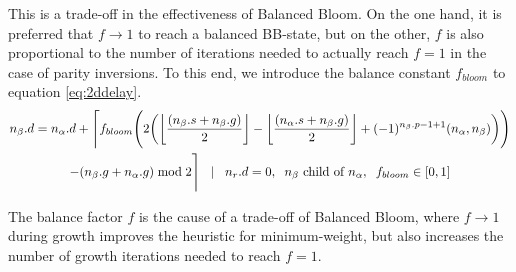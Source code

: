 This is a trade-off in the effectiveness of Balanced Bloom. On the one hand, it is preferred that $f\to1$ to reach a balanced BB-state, but on the other, $f$ is also proportional to the number of iterations needed to actually reach $f=1$ in the case of parity inversions. To this end, we introduce the balance constant $f_{bloom}$ to equation \ref{eq:2ddelay}.
\begin{multline}\label{eq:delayequation}
  n_\beta.d = n_\alpha.d + \Bigg \lceil f_{bloom} \Bigg( 2\bigg({\left \lfloor \frac{(n_\beta.s+n_\beta.g)}{2} \right \rfloor } - {\left \lfloor \frac{(n_\alpha.s+n_\beta.g)}{2} \right \rfloor } + (-1)^{n_\beta.p-1+1}(n_\alpha,n_\beta)\bigg)
   \Bigg) \\ - (n_\beta.g + n_\alpha.g)\bmod 2 \Bigg \rceil \hspace{.3cm} | \hspace{.3cm} n_r.d = 0, \hspace{.2cm} n_\beta \mbox{ child of } n_\alpha, \hspace{.2cm} f_{bloom} \in [0, 1]
\end{multline}
\begin{lemma}\label{lem:tradeoff}
  The balance factor $f$ is the cause of a trade-off of Balanced Bloom, where $f\to1$ during growth improves the heuristic for minimum-weight, but also increases the number of growth iterations needed to reach $f=1$.
\end{lemma}

